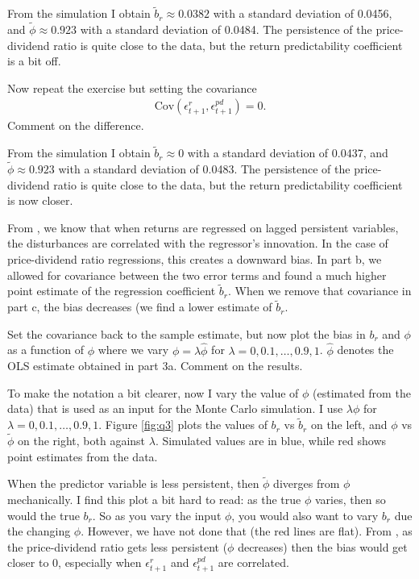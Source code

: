 From the simulation I obtain $\tilde{b}_r \approx 0.0382$ with a standard deviation of 0.0456, and $\tilde{\phi} \approx 0.923$ with a standard deviation of 0.0484. The persistence of the price-dividend ratio is quite close to the data, but the return predictability coefficient is a bit off.

\pagebreak
\begin{answer}[Part c]
Now repeat the exercise but setting the covariance
\begin{align}
\text{Cov}(\epsilon_{t+1}^r , \epsilon_{t+1}^{pd} ) =0.
\end{align}
Comment on the difference.
\end{answer}
From the simulation I obtain $\tilde{b}_r \approx 0$ with a standard deviation of 0.0437, and $\tilde{\phi} \approx 0.923$ with a standard deviation of 0.0483. The persistence of the price-dividend ratio is quite close to the data, but the return predictability coefficient is now closer.

From \cite{stambaugh1999}, we know that when returns are regressed on lagged persistent variables, the disturbances are correlated with the regressor's innovation. In the case of price-dividend ratio regressions, this creates a downward bias. In part b, we allowed for covariance between the two error terms and found a much higher point estimate of the regression coefficient $\tilde{b}_r$. When we remove that covariance in part c, the bias decreases (we find a lower estimate of $\tilde{b}_r$.


\begin{answer}[Part d]
Set the covariance back to the sample estimate, but now plot the bias in $b_r$ and $\phi$ as a function of $\phi$ where we vary $\phi = \lambda \hat{\phi}$ for $\lambda = 0, 0.1, \dots, 0.9, 1$. $\hat{\phi}$ denotes the OLS estimate obtained in part 3a. Comment on the results.
\end{answer}
To make the notation a bit clearer, now I vary the value of $\phi$ (estimated from the data) that is used as an input for the Monte Carlo simulation. I use $\lambda \phi$ for $\lambda = 0, 0.1,\dots,0.9,1$. Figure \ref{fig:q3} plots the values of $b_r$ vs $\tilde{b}_r$ on the left, and $\phi$ vs $\tilde{\phi}$ on the right, both against $\lambda$. Simulated values are in blue, while red shows point estimates from the data.

When the predictor variable is less persistent, then $\tilde{\phi}$ diverges from $\phi$ mechanically. I find this plot a bit hard to read: as the true $\phi$ varies, then so would the true $b_r$. So as you vary the input $\phi$, you would also want to vary $b_r$ due the changing $\phi$. However, we have not done that (the red lines are flat). From \cite{stambaugh1999}, as the price-dividend ratio gets less persistent ($\phi$ decreases) then the bias would get closer to 0, especially when $\epsilon_{t+1}^r$ and $\epsilon_{t+1}^{pd}$ are correlated.


